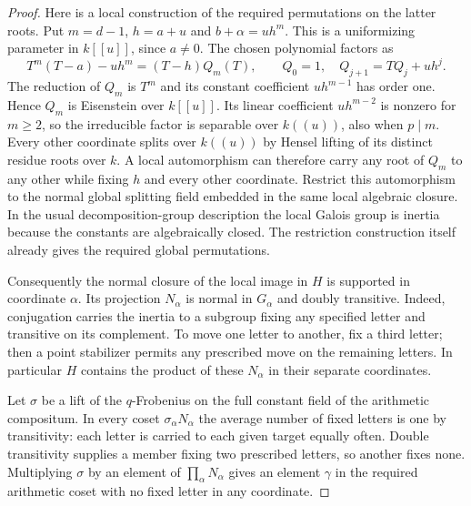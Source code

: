 \documentclass[preprint,12pt,numbers]{elsarticle}
\begin{document}
\begin{proof}
Here is a local construction of the required permutations on the latter
roots. Put $m=d-1$, $h=a+u$ and $b+\alpha=u h^m$. This is a uniformizing
parameter in $k[[u]]$, since $a\ne0$. The chosen polynomial factors as
\[
  T^m(T-a)-uh^m=(T-h)Q_m(T),\qquad
  Q_0=1,\quad Q_{j+1}=TQ_j+uh^j .
\]
The reduction of $Q_m$ is $T^m$ and its constant coefficient
$uh^{m-1}$ has order one. Hence $Q_m$ is Eisenstein over $k[[u]]$.
Its linear coefficient $uh^{m-2}$ is nonzero for $m\ge2$, so the
irreducible factor is separable over $k((u))$, also when $p\mid m$.
Every other coordinate splits over $k((u))$ by Hensel lifting of
its distinct residue roots over $k$. A local automorphism can
therefore carry any root of $Q_m$ to any other while fixing $h$
and every other coordinate. Restrict this automorphism to the normal
global splitting field embedded in the same local algebraic closure.
In the usual decomposition-group description the local Galois group
is inertia because the constants are algebraically closed. The
restriction construction itself already gives the required global
permutations.

Consequently the normal closure of the local image in $H$ is supported
in coordinate $\alpha$. Its projection $N_\alpha$ is normal in
$G_\alpha$ and doubly transitive. Indeed, conjugation carries the
inertia to a subgroup fixing any specified letter and transitive
on its complement. To move one letter to another, fix a third
letter; then a point stabilizer permits any prescribed move on
the remaining letters. In particular $H$ contains the product of
these $N_\alpha$ in their separate coordinates.

Let $\sigma$ be a lift of the $q$-Frobenius on the full constant
field of the arithmetic compositum. In every coset
$\sigma_\alpha N_\alpha$ the average number of fixed letters is
one by transitivity: each letter is carried to each given target
equally often. Double transitivity supplies a member fixing two
prescribed letters, so another fixes none. Multiplying $\sigma$ by
an element of $\prod_\alpha N_\alpha$ gives an element $\gamma$ in
the required arithmetic coset with no fixed letter in any coordinate.


\end{proof}
\end{document}
